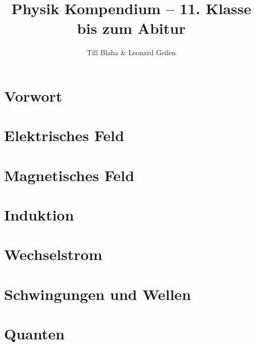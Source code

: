 \documentclass[a5paper, 9pt, twoside]{book}
\title{Physik Kompendium -- 11. Klasse bis zum Abitur}
\author{Till Blaha \& Leonard Geilen}
\begin{document}
\maketitle
\tableofcontents
\newpage


\chapter*{Vorwort}


\chapter{Elektrisches Feld}


\chapter{Magnetisches Feld}


\chapter{Induktion}


\chapter{Wechselstrom}


\chapter{Schwingungen und Wellen}


\chapter{Quanten}



%	
\end{document}
